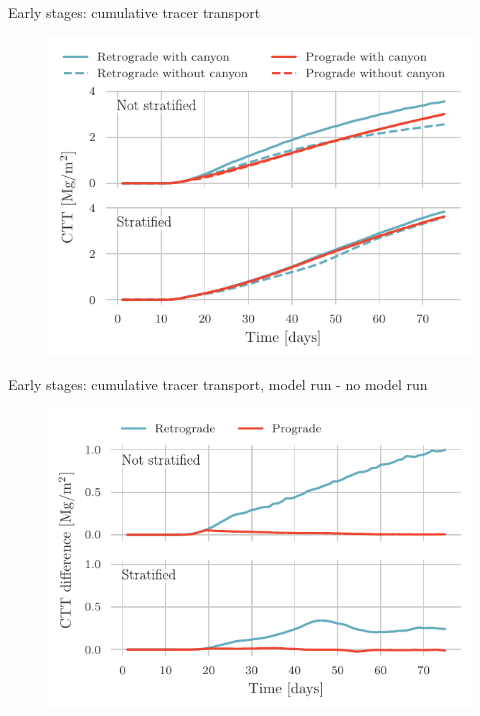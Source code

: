 \documentclass{beamer}
\begin{document}
\begin{frame}{Early stages: cumulative tracer transport}
\begin{figure}
\centering
\includegraphics{figures/Huon_dye_01_cumulative_transport_baseline.pdf}
\end{figure}
\end{frame}

\begin{frame}{Early stages: cumulative tracer transport, model run - no model run}
\begin{figure}
\centering
\includegraphics{figures/Huon_dye_01_cumulative_transport_diff_baseline.pdf}
\end{figure}
\end{frame}
\end{document}
